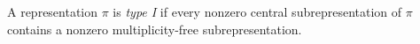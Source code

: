 A representation $\pi$ is \emph{type I} if every nonzero central subrepresentation of $\pi$ contains a nonzero multiplicity-free subrepresentation.
